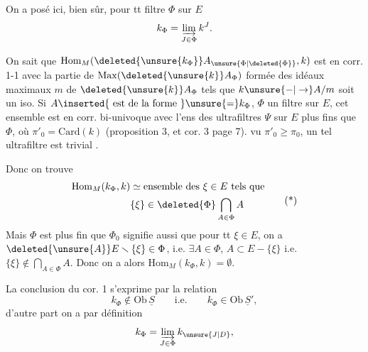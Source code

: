 
On a posé ici, bien sûr, pour tt filtre $\Phi$ sur $E$
\[
 k_{\Phi}=\varinjlim_{J\in\Phi}k^J .
\]

On sait que 
$\mathrm{Hom}_M(\deleted{\unsure{k_{\Phi}}}A_{\unsure{\Phi|\deleted{\Phi}}},k)$ est en
corr. 1-1 avec la partie de $\mathrm{Max}(\deleted{\unsure{k}}A_{\Phi})$
formée des idéaux maximaux $m$ de $\deleted{\unsure{k}}A_{\Phi}$
tels que  $k\unsure{-|\to}A/m$ soit un iso.
Si $A\inserted{\text{ est de la forme }}\unsure{=}k_{\Phi}$, $\Phi$ un filtre
sur $E$, cet ensemble est en corr. bi-univoque avec l'ens des
ultrafiltres $\Psi$ sur $E$ plus fins que $\Phi$,
où $\pi'_0=\mathrm{Card}(k)$ (proposition 3, et cor. 3
 page 7).  vu
$\pi'_0\geq\pi_0$, un tel ultrafiltre est trivial
.

Donc on trouve
\[
\begin{aligned}
\mathrm{Hom}_M(k_{\Phi},k)&\simeq\text{ensemble des }\xi\in E\text{ tels que}\\
&\{\xi\}\in\deleted{\Phi}\bigcap_{A\in\Phi}A
\end{aligned}\tag*{(*)}
\]
Mais   $\Phi$ est plus fin que
$\Phi_0$ signifie aussi que pour tt $\xi\in E$, on a
$\deleted{\unsure{A}}E\smallsetminus\{\xi\}\in\Phi$, i.e.
$\exists A\in\Phi$,  $A\subset E-\{\xi\}$ i.e.
 $\{\xi\}\notin\bigcap_{A\in\Phi}A$.
Donc on a alors $\mathrm{Hom}_M(k_{\Phi},k)=\emptyset$.

 La conclusion du cor. 1 s'exprime
par la relation
\[
 k_{\Phi}\notin\mathrm{Ob}\,\underline S\qquad\text{i.e.}\qquad
 k_{\Phi}\in\mathrm{Ob}\,\underline S',
\]
d'autre part on a par définition
\[
 k_{\Phi}=\varinjlim_{J\in\Phi}k_{\unsure{J|D}},
\]
